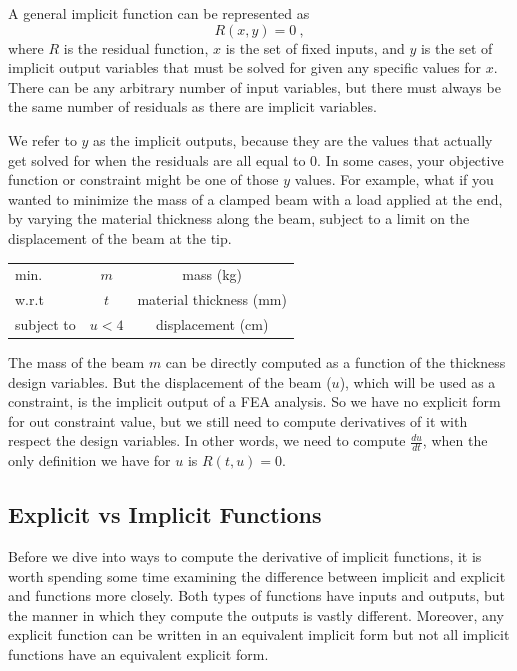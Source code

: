 \documentclass[conf]{new-aiaa}
\begin{document}
    A general implicit function can be represented as 
    \begin{equation}
        R(x,y) = 0 \ , 
    \end{equation}
    where $R$ is the residual function, $x$ is the set of fixed inputs, and $y$ is the set of implicit output variables that must be solved for given any specific values for $x$. 
    There can be any arbitrary number of input variables, but there must always be the same number of residuals as there are implicit variables. 

    We refer to $y$ as the implicit outputs, because they are the values that actually get solved for when the residuals are all equal to 0.
    In some cases, your objective function or constraint might be one of those $y$ values. 
    For example, what if you wanted to minimize the mass of a clamped beam with a load applied at the end, by varying the material thickness along the beam, subject to a limit on the displacement of the beam at the tip. 
    \begin{table}[H]
        \centering
        \begin{tabular}{lcc}
            \hline
            min. & $m$ & mass (kg)\\
            w.r.t & $t$ & material thickness (mm) \\ 
            subject to & $u < 4$ & displacement (cm)\\ \hline
        \end{tabular}
    \end{table}
    The mass of the beam $m$ can be directly computed as a function of the thickness design variables. 
    But the displacement of the beam ($u$), which will be used as a constraint, is the implicit output of a FEA analysis. 
    So we have no explicit form for out constraint value, but we still need to compute derivatives of it with respect the design variables. 
    In other words, we need to compute $\frac{du}{dt}$, when the only definition we have for $u$ is $R(t,u)=0$.

    \subsection{Explicit vs Implicit Functions}
    Before we dive into ways to compute the derivative of implicit functions, it is worth spending some time examining the difference between implicit and explicit and functions more closely. 
    Both types of functions have inputs and outputs, but the manner in which they compute the outputs is vastly different. 
    Moreover, any explicit function can be written in an equivalent implicit form but not all implicit functions have an equivalent explicit form. 
\end{document}

